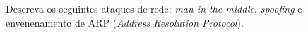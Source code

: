 \exercise Descreva os seguintes ataques de rede: {\em man in the
  middle}, {\em spoofing} e envenenamento de ARP ({\em Address
  Resolution Protocol}).\par